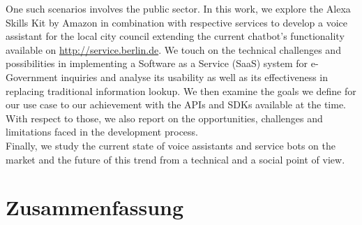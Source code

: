 One such scenarios involves the public sector. In this work, we explore the Alexa Skills Kit by Amazon in combination with respective services to develop a voice assistant for the local city council extending the current chatbot's functionality available on \href{ https://service.berlin.de/virtueller-assistent/virtueller-assistent-606279.php}{http://service.berlin.de}. We touch on the technical challenges and possibilities in implementing a Software as a Service (SaaS) system for e-Government inquiries and analyse its usability as well as its effectiveness in replacing traditional information lookup. We then examine the goals we define for our use case to our achievement with the APIs and SDKs available at the time. With respect to those, we also report on the opportunities, challenges and limitations faced in the development process.\\

Finally, we study the current state of voice assistants and service bots on the market and the future of this trend from a technical and a social point of view.




\newpage
\chapter*{Zusammenfassung}

